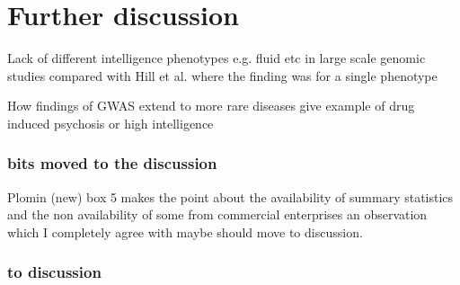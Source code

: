 \section{Further discussion}
Lack of different intelligence phenotypes e.g. fluid etc in large scale genomic studies compared with Hill et al. where the finding was for a single phenotype


How findings of GWAS extend to more rare diseases give example of drug induced psychosis or high intelligence

\subsubsection{bits moved to the discussion}
Plomin (new) \cite{plomin2018new} box 5 makes the point about the availability of summary statistics and the non availability of some from commercial enterprises an observation which I completely agree with maybe should move to discussion.
\subsubsection{to discussion}
\label{sec:other network gsa intro discussion}


 
 




